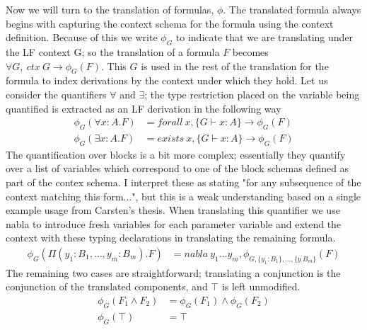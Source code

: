 \documentclass[12pt]{article}
\begin{document}
{Now we will turn to the translation of formulas, $\phi$.
%
The translated formula always begins with capturing the context schema for the 
formula using the context definition.
%
Because of this we write $\phi_G$ to indicate that we are translating under the 
LF context G; so the translation of a formula $F$ becomes 
$\forall G,~ctx~G\rightarrow\phi_G(F)$.
%
This $G$ is used in the rest of the translation for the formula to index 
derivations by the context under which they hold.
%
Let us consider the quantifiers $\forall$ and $\exists$; the type restriction 
placed on the variable being quantified is extracted as an LF derivation in the 
following way
\begin{align*}
\phi_G(\forall x:A.F) &= forall~x, \{G\vdash x:A\}\rightarrow \phi_G(F)\\
\phi_G(\exists x:A.F) &= exists~x, \{G\vdash x:A\}\rightarrow \phi_G(F)
\end{align*}
%
The quantification over blocks is a bit more complex; essentially they quantify 
over a list of variables which correspond to one of the block schemas defined as 
part of the contex schema.
%
I interpret these as stating "for any subsequence of the context matching this form...", 
but this is a weak understanding based on a single example usage from Carsten's thesis.
%
When translating this quantifier we use nabla to introduce fresh variables for each
parameter variable and extend the context with these typing declarations in 
translating the remaining formula.
%
\begin{align*}
\phi_G(\Pi (y_1:B_1,\ldots,y_m:B_m).F) &= 
  nabla~y_1\ldots y_m, \phi_{G,\{y_1:B_1\},\ldots,\{y_:B_m\} }(F)
\end{align*}
%
The remaining two cases are straightforward; translating a conjunction is the 
conjunction of the translated components, and $\top$ is left unmodified.
\begin{align*}
\phi_G(F_1\wedge F_2) &= \phi_G(F_1)\wedge\phi_G(F_2)\\
\phi_G(\top) &= \top
\end{align*}

}
\end{document}

